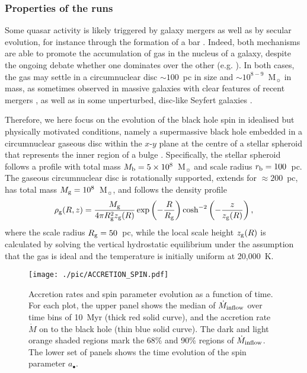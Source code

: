 \documentclass[a4paper,fleqn,usenatbib]{mnras}
\begin{document}
\subsubsection{Properties of the runs}

Some quasar activity is likely triggered by galaxy mergers \citep{barnes+91,springel+05, hopkins+06, hopkins+08} as well as by secular evolution, for instance through the formation of a bar \citep{laine+02, laurikainen+04, fanali+15}.
Indeed, both mechanisms are able to promote the accumulation of gas in the nucleus of a galaxy, despite the ongoing debate whether one dominates over the other (e.g.  \citealt{lee+12, oh+12, alonso+13, cisternas+13}).
In both cases, the gas may settle in a circumnuclear disc $\sim 100$~pc in size and $\sim 10^{8-9}$~M$_{\sun}$ in mass, as sometimes observed in massive galaxies with clear features of recent mergers \citep{downes+98, medling+14}, as well as in some unperturbed, disc-like Seyfert galaxies \citep{schinnerer+99, chou+07}.

Therefore, we here focus on the evolution of the black hole spin in idealised but physically motivated conditions, namely a supermassive black hole embedded in a circumnuclear gaseous disc within the $x$-$y$ plane at the centre of a stellar spheroid that represents the inner region of a bulge \citep{fiacconi+13,maio+13, lupi+15}.
Specifically, the stellar spheroid follows a \citet{hernquist+90} profile with total mass $M_{\rm b} = 5 \times 10^{8}$~M$_{\sun}$ and scale radius $r_{\rm b} = 100$~pc.
The gaseous circumnuclear disc is rotationally supported, extends for $\approx 200$~pc, has total mass $M_{\rm g} = 10^{8}$~M$_{\sun}$, and follows the density profile \citep{hernquist+93} 
\begin{equation}
\rho_{\rm g}(R, z) = \frac{M_{\rm g}}{4 \pi R_{\rm g}^2 z_{\rm g}(R)} \exp\left(- \frac{R}{R_{\rm g}} \right) \cosh^{-2}\left(- \frac{z}{z_{\rm g}(R)} \right),
\end{equation}
where the scale radius $R_{\rm g} = 50$~pc, while the local scale height $z_{\rm g}(R)$ is calculated by solving the vertical hydrostatic equilibrium under the assumption that the gas is ideal and the temperature is initially uniform at 20,000~K.

\begin{figure*}
\begin{center}
\texttt{[image: ./pic/ACCRETION\_SPIN.pdf]}
\caption{Accretion rates and spin parameter evolution as a function of time.
For each plot, the upper panel shows the median of $\dot{M}_{\rm inflow}$ over time bins of 10~Myr (thick red solid curve), and the accretion rate $\dot{M}$ on to the black hole (thin blue solid curve).
The dark and light orange shaded regions mark the 68\% and 90\% regions of $\dot{M}_{\rm inflow}$.
The lower set of panels shows the time evolution of the spin parameter $a_{\bullet}$.
}
\label{fig_mdot_a}
\end{center}
\end{figure*}
\end{document}
